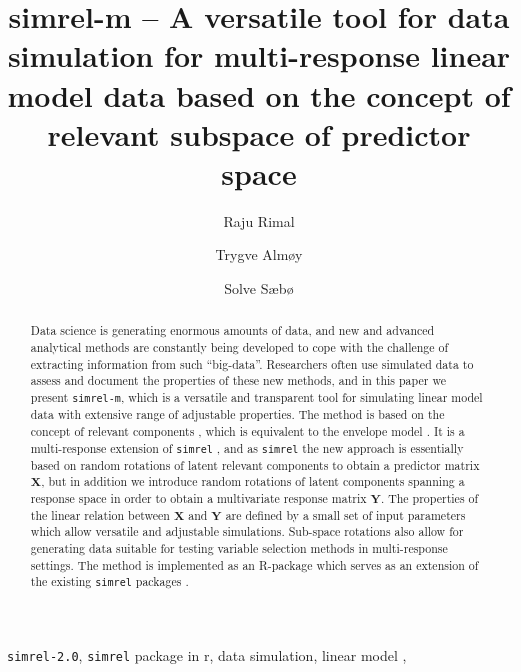 \documentclass[12pt,a4paperpaper,authoryear]{elsarticle} %
\begin{document}
\begin{frontmatter}

  \title{simrel-m -- A versatile tool for data simulation for multi-response
linear model data based on the concept of relevant subspace of predictor
space}
    \author[Norwegian University of Life Sciences]{Raju Rimal}
  
  
    \author[Norwegian University of Life Sciences]{Trygve Almøy}
  
  
    \author[Norwegian University of Life Sciences]{Solve Sæbø}
  
    
  \begin{abstract}
  \small
  Data science is generating enormous amounts of data, and new and
  advanced analytical methods are constantly being developed to cope with
  the challenge of extracting information from such ``big-data''.
  Researchers often use simulated data to assess and document the
  properties of these new methods, and in this paper we present
  \texttt{simrel-m}, which is a versatile and transparent tool for
  simulating linear model data with extensive range of adjustable
  properties. The method is based on the concept of relevant components
  \citet{helland1994comparison}, which is equivalent to the envelope model
  \citet{cook2013envelopes}. It is a multi-response extension of
  \texttt{simrel} \citet{saebo2015simrel}, and as \texttt{simrel} the new
  approach is essentially based on random rotations of latent relevant
  components to obtain a predictor matrix \(\mathbf{X}\), but in addition
  we introduce random rotations of latent components spanning a response
  space in order to obtain a multivariate response matrix \(\mathbf{Y}\).
  The properties of the linear relation between \(\mathbf{X}\) and
  \(\mathbf{Y}\) are defined by a small set of input parameters which
  allow versatile and adjustable simulations. Sub-space rotations also
  allow for generating data suitable for testing variable selection
  methods in multi-response settings. The method is implemented as an
  R-package which serves as an extension of the existing \texttt{simrel}
  packages \citet{saebo2015simrel}.
  \end{abstract}
   \begin{keyword} \footnotesize \texttt{simrel-2.0}, \texttt{simrel} package in r, data
simulation, linear model \sep \end{keyword}
 \end{frontmatter}
\end{document}
